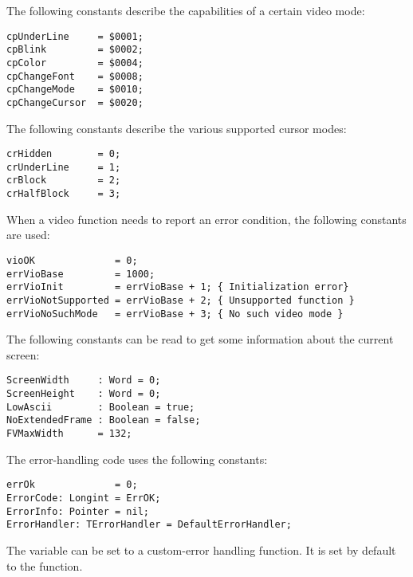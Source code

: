 The following constants describe the capabilities of a certain video mode:
\begin{verbatim}
cpUnderLine     = $0001;
cpBlink         = $0002;
cpColor         = $0004;
cpChangeFont    = $0008;
cpChangeMode    = $0010;
cpChangeCursor  = $0020;
\end{verbatim}
The following constants describe the various supported cursor modes:
\begin{verbatim}
crHidden        = 0;
crUnderLine     = 1;
crBlock         = 2;
crHalfBlock     = 3;
\end{verbatim}
When a video function needs to report an error condition, the following
constants are used:
\begin{verbatim}
vioOK              = 0;
errVioBase         = 1000;
errVioInit         = errVioBase + 1; { Initialization error}
errVioNotSupported = errVioBase + 2; { Unsupported function }
errVioNoSuchMode   = errVioBase + 3; { No such video mode }
\end{verbatim}
The following constants can be read to get some information about the
current screen:
\begin{verbatim}
ScreenWidth     : Word = 0;
ScreenHeight    : Word = 0;
LowAscii        : Boolean = true;
NoExtendedFrame : Boolean = false;
FVMaxWidth      = 132;
\end{verbatim}
The error-handling code uses the following constants:
\begin{verbatim}
errOk              = 0;
ErrorCode: Longint = ErrOK;
ErrorInfo: Pointer = nil;
ErrorHandler: TErrorHandler = DefaultErrorHandler;
\end{verbatim}
The  variable can be set to a custom-error handling
function. It is set by default to the  function.

